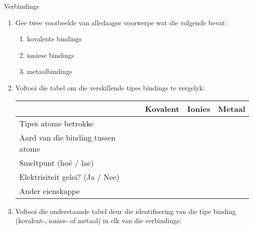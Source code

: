 \begin{exercises}{Verbindings}
{
            \nopagebreak
        \label{m38694*id143111}\begin{enumerate}[noitemsep, label=\textbf{\arabic*}. ] 
            \label{m38694*uid86}\item Gee twee voorbeelde van alledaagse voorwerpe wat die volgende bevat:
\label{m38694*id143127}\begin{enumerate}[noitemsep, label=\textbf{\alph*}. ] 
            \label{m38694*uid87}\item kovalente bindings
\label{m38694*uid88}\item ioniese bindings
\label{m38694*uid89}\item metaalbindings
\end{enumerate}
                \label{m38694*uid90}\item Voltooi die tabel om die verskillende tipes bindings te vergelyk:
          \begin{table}[H]
        \begin{center}
      \label{m38694*id143180}
    \noindent
      \begin{tabular}{|l|l|l|l|}\hline
         &
        \textbf{Kovalent} &
        \textbf{Ionies} &
        \textbf{Metaal} \\ \hline
        Tipes atome betrokke &
         &
         &
        \\ \hline
        Aard van die binding tussen atome &
         &
         &
       \\ \hline
        Smeltpunt (ho\"{e} / lae) &
         &
         &
       \\ \hline
        Elektrisiteit gelei? (Ja / Nee) &
         &
         &
      \\ \hline
        Ander eienskappe &
         &
         &
       \\ \hline
    \end{tabular}
      \end{center}
\end{table}
    \par
          \label{m38694*uid91}\item Voltooi die onderstaande tabel deur die identifisering van die tipe binding (kovalent-,  ionies- of  metaal) in elk van die verbindings:

\end{enumerate}}
\end{exercises}
